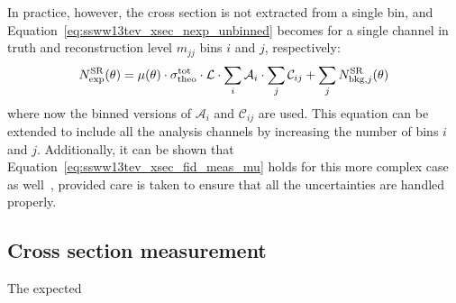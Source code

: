 In practice, however, the cross section is not extracted from a single bin, and Equation~\ref{eq:ssww13tev_xsec_nexp_unbinned} becomes for a single channel in truth and reconstruction level $m_{jj}$ bins $i$ and $j$, respectively:
\begin{equation}
  N_{\textrm{exp}}^{\textrm{SR}}(\theta) = \mu(\theta)\cdot\sigma_{\textrm{theo}}^{\textrm{tot}}\cdot\mathcal{L}\cdot\sum\limits_i\mathcal{A}_i\cdot\sum\limits_j\mathcal{C}_{ij}+\sum\limits_j N_{\textrm{bkg},j}^{\textrm{SR}}(\theta)
\end{equation}
where now the binned versions of $\mathcal{A}_i$ and $\mathcal{C}_{ij}$ are used.
This equation can be extended to include all the analysis channels by increasing the number of bins $i$ and $j$.
Additionally, it can be shown that Equation~\ref{eq:ssww13tev_xsec_fid_meas_mu} holds for this more complex case as well~\cite{2018.ssww-13tev-atlas-support}, provided care is taken to ensure that all the uncertainties are handled properly.


\subsection{Cross section measurement}\label{ssww13tev:xsec_results}
The expected 
